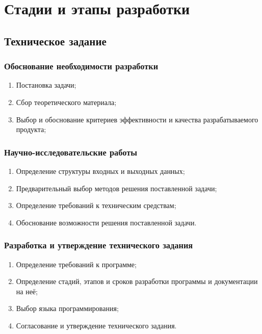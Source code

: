 \documentclass[a4paper,12pt,reqno]{article}
\begin{document}
  \newpage
  \section{Стадии и этапы разработки}
    \subsection{Техническое задание}
      \subsubsection*{Обоснование необходимости разработки}
      \begin{enumerate}
        \item Постановка задачи;
        \item Сбор теоретического материала;
        \item Выбор и обоснование критериев эффективности и качества разрабатываемого продукта;
      \end{enumerate}
      \subsubsection*{Научно-исследовательские работы}
      \begin{enumerate}
        \item Определение структуры входных и выходных данных;
        \item Предварительный выбор методов решения поставленной задачи;
        \item Определение требований к техническим средствам;
        \item Обоснование возможности решения поставленной задачи.
      \end{enumerate}
      \subsubsection*{Разработка и утверждение технического задания}
      \begin{enumerate}
        \item Определение требований к программе;
        \item Определение стадий, этапов и сроков разработки программы и документации на неё;
        \item Выбор языка программирования;
        \item Согласование и утверждение технического задания.
      \end{enumerate}
\end{document}
